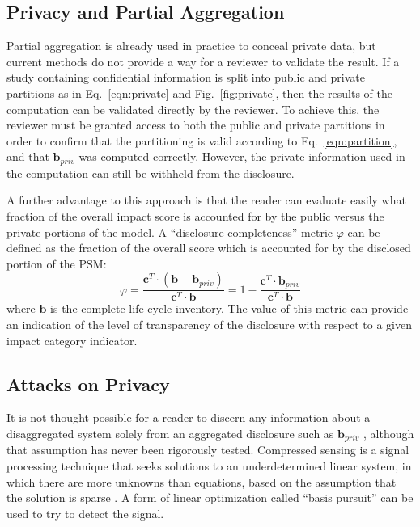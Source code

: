 \subsection{Privacy and Partial Aggregation} 

Partial aggregation is already used in practice to conceal private data, but current methods do not provide a way for a reviewer to validate the result.  If a study containing confidential information is split into public and private partitions as in Eq.~\ref{eqn:private} and Fig.~\ref{fig:private}, then the results of the computation can be validated directly by the reviewer.  To achieve this, the reviewer must be granted access to both the public and private partitions in order to confirm that the partitioning is valid according to Eq.~\ref{eqn:partition}, and that $\mathbf{b}_{priv}$ was computed correctly.  However, the private information used in the computation can still be withheld from the disclosure.

A further advantage to this approach is that the reader can evaluate easily what fraction of the overall impact score is accounted for by the public versus the private portions of the model.  A ``disclosure completeness'' metric $\varphi$ can be defined as the fraction of the overall score which is accounted for by the disclosed portion of the PSM:
\begin{equation}
  \varphi =  \frac{\mathbf{c}^T\cdot(\mathbf{b} - \mathbf{b}_{priv})}{\mathbf{c}^T\cdot\mathbf{b}} = 1 - \frac{\mathbf{c}^T\cdot\mathbf{b}_{priv}}{\mathbf{c}^T\cdot\mathbf{b}}
  \label{eqn:metric}
\end{equation}
where $\mathbf{b}$ is the complete life cycle inventory.  The value of this metric can provide an indication of the level of transparency of the disclosure with respect to a given impact category indicator.  

\subsection{Attacks on Privacy}

It is not thought possible for a reader to discern any information about a disaggregated system solely from an aggregated disclosure such as $\mathbf{b}_{priv}$ \citep[Ch. 3]{UNEP_2011}, although that assumption has never been rigorously tested.  Compressed sensing is a signal processing technique that seeks solutions to an underdetermined linear system, in which there are more unknowns than equations, based on the assumption that the solution is sparse \citep{Donoho_2006}.  A form of linear optimization called ``basis pursuit'' can be used to try to detect the signal.

